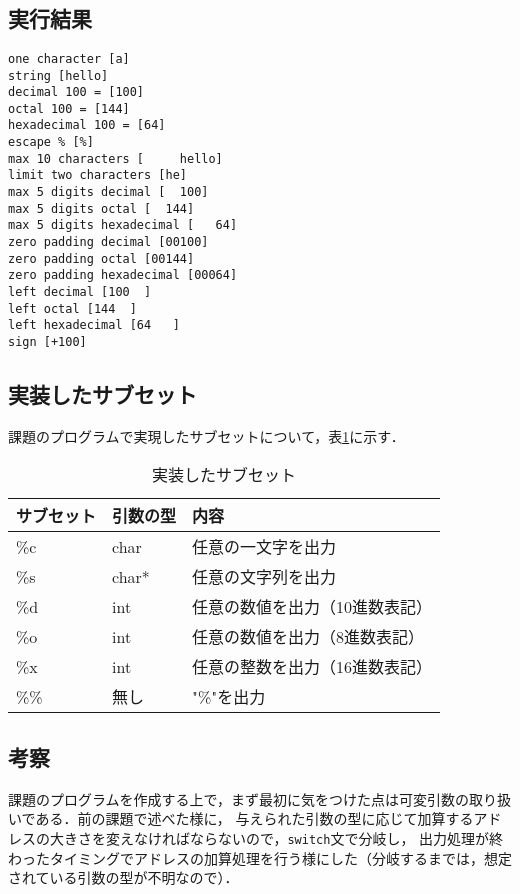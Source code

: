 \documentclass[a4j,11pt]{jarticle}
\begin{document}
\begin{verbatim}
      
\end{verbatim}

\subsection{実行結果}
\begin{verbatim}
one character [a]
string [hello]
decimal 100 = [100]
octal 100 = [144]
hexadecimal 100 = [64]
escape % [%]
max 10 characters [     hello]
limit two characters [he]
max 5 digits decimal [  100]
max 5 digits octal [  144]
max 5 digits hexadecimal [   64]
zero padding decimal [00100]
zero padding octal [00144]
zero padding hexadecimal [00064]
left decimal [100  ]
left octal [144  ]
left hexadecimal [64   ]
sign [+100]
\end{verbatim}

\subsection{実装したサブセット}
課題のプログラムで実現したサブセットについて，表\ref{tbl:2-5}に示す．

\begin{table}[]
      \centering
      \caption{実装したサブセット}
      \label{tbl:2-5}
      \begin{tabular}{|l|l|l|}
            \hline
            サブセット & 引数の型  & 内容                  \\ \hline
            \%c   & char  & 任意の一文字を出力           \\ \hline
            \%s   & char* & 任意の文字列を出力           \\ \hline
            \%d   & int   & 任意の数値を出力（10進数表記）    \\ \hline
            \%o   & int   & 任意の数値を出力（8進数表記）     \\ \hline
            \%x   & int   & 任意の整数を出力（16進数表記）    \\ \hline
            \%\%  & 無し    & "\%"を出力             \\ \hline
      \end{tabular}
\end{table}

\subsection{考察}
課題のプログラムを作成する上で，まず最初に気をつけた点は可変引数の取り扱いである．前の課題で述べた様に，
与えられた引数の型に応じて加算するアドレスの大きさを変えなければならないので，{{\tt switch}}文で分岐し，
出力処理が終わったタイミングでアドレスの加算処理を行う様にした（分岐するまでは，想定されている引数の型が不明なので）．
\end{document}
